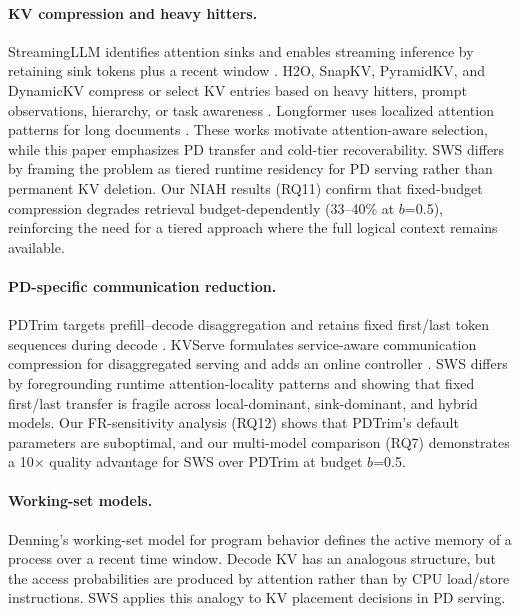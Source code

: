 \documentclass[11pt]{article}
\newcommand{\method}{SWS}
\newcommand{\sws}{SWS}
\newcommand{\pct}{\%}
\theoremstyle{definition}
\theoremstyle{plain}
\begin{document}
\paragraph{KV compression and heavy hitters.}
StreamingLLM identifies attention sinks and enables streaming inference by retaining sink tokens plus a recent window \citep{streamingllm}.  H2O, SnapKV, PyramidKV, and DynamicKV compress or select KV entries based on heavy hitters, prompt observations, hierarchy, or task awareness \citep{h2o,snapkv,pyramidkv,dynamickv}.  Longformer uses localized attention patterns for long documents \citep{longformer}.  These works motivate attention-aware selection, while this paper emphasizes PD transfer and cold-tier recoverability.  \method{} differs by framing the problem as tiered runtime residency for PD serving rather than permanent KV deletion.  Our NIAH results (RQ11) confirm that fixed-budget compression degrades retrieval budget-dependently (33--40\pct{} at $b$=0.5), reinforcing the need for a tiered approach where the full logical context remains available.

\paragraph{PD-specific communication reduction.}
PDTrim targets prefill--decode disaggregation and retains fixed first/last token sequences during decode \citep{pdtrim}.  KVServe formulates service-aware communication compression for disaggregated serving and adds an online controller \citep{kvserve}.  \method{} differs by foregrounding runtime attention-locality patterns and showing that fixed first/last transfer is fragile across local-dominant, sink-dominant, and hybrid models.  Our FR-sensitivity analysis (RQ12) shows that PDTrim's default parameters are suboptimal, and our multi-model comparison (RQ7) demonstrates a 10$\times$ quality advantage for \sws{} over PDTrim at budget $b$=0.5.

\paragraph{Working-set models.}
Denning's working-set model for program behavior \citep{denning1968working} defines the active memory of a process over a recent time window.  Decode KV has an analogous structure, but the access probabilities are produced by attention rather than by CPU load/store instructions.  \method{} applies this analogy to KV placement decisions in PD serving.
\end{document}
